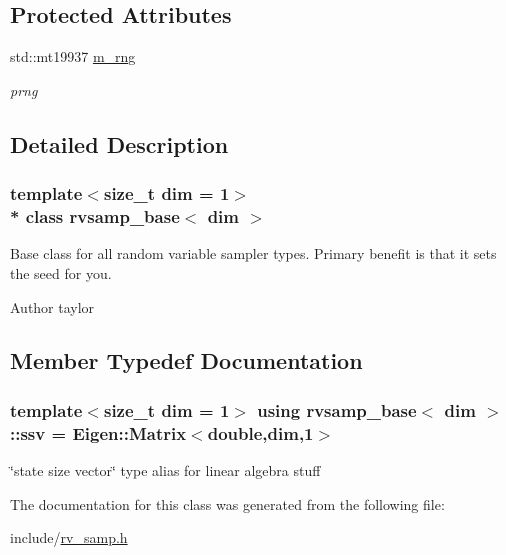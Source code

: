 \subsection*{Protected Attributes}
\begin{DoxyCompactItemize}
\item 
std\+::mt19937 \hyperlink{classrvsamp__base_aa3df1440582518e6da779499728cac3c}{m\+\_\+rng}\hypertarget{classrvsamp__base_aa3df1440582518e6da779499728cac3c}{}\label{classrvsamp__base_aa3df1440582518e6da779499728cac3c}

\begin{DoxyCompactList}\small\item\em prng \end{DoxyCompactList}\end{DoxyCompactItemize}


\subsection{Detailed Description}
\subsubsection*{template$<$size\+\_\+t dim = 1$>$\\*
class rvsamp\+\_\+base$<$ dim $>$}

Base class for all random variable sampler types. Primary benefit is that it sets the seed for you. 

\begin{DoxyAuthor}{Author}
taylor 
\end{DoxyAuthor}


\subsection{Member Typedef Documentation}
\subsubsection[{\texorpdfstring{ssv}{ssv}}]{\setlength{\rightskip}{0pt plus 5cm}template$<$size\+\_\+t dim = 1$>$ using {\bf rvsamp\+\_\+base}$<$ dim $>$\+::{\bf ssv} =  Eigen\+::\+Matrix$<$double,dim,1$>$}\hypertarget{classrvsamp__base_a744275f57e806e6c787e331241b306eb}{}\label{classrvsamp__base_a744275f57e806e6c787e331241b306eb}
\char`\"{}state size vector\char`\"{} type alias for linear algebra stuff 

The documentation for this class was generated from the following file\+:\begin{DoxyCompactItemize}
\item 
include/\hyperlink{rv__samp_8h}{rv\+\_\+samp.\+h}\end{DoxyCompactItemize}
